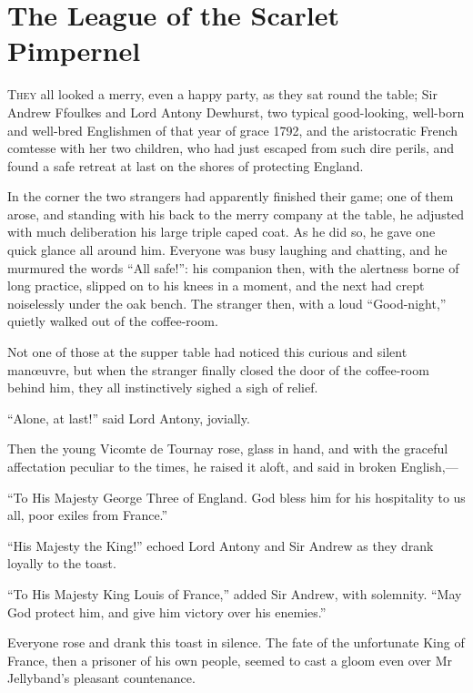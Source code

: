 
\chapter{The League of the Scarlet Pimpernel}

\lettrine[lines=4]{T}{hey} all looked a merry, even a happy party, as they sat round the table; Sir Andrew Ffoulkes and Lord Antony Dewhurst, two typical good-looking, well-born and well-bred Englishmen of that year of grace 1792, and the aristocratic French comtesse with her two children, who had just escaped from such dire perils, and found a safe retreat at last on the shores of protecting England.

In the corner the two strangers had apparently finished their game; one of them arose, and standing with his back to the merry company at the table, he adjusted with much deliberation his large triple caped coat. As he did so, he gave one quick glance all around him. Everyone was busy laughing and chatting, and he murmured the words \enquote{All safe!}: his companion then, with the alertness borne of long practice, slipped on to his knees in a moment, and the next had crept noiselessly under the oak bench. The stranger then, with a loud \enquote{Good-night,} quietly walked out of the coffee-room.

Not one of those at the supper table had noticed this curious and silent manœuvre, but when the stranger finally closed the door of the coffee-room behind him, they all instinctively sighed a sigh of relief.

\enquote{Alone, at last!} said Lord Antony, jovially.

Then the young Vicomte de Tournay rose, glass in hand, and with the graceful affectation peculiar to the times, he raised it aloft, and said in broken English,---

\enquote{To His Majesty George Three of England. God bless him for his hospitality to us all, poor exiles from France.}

\enquote{His Majesty the King!} echoed Lord Antony and Sir Andrew as they drank loyally to the toast.

\enquote{To His Majesty King Louis of France,} added Sir Andrew, with solemnity. \enquote{May God protect him, and give him victory over his enemies.}

Everyone rose and drank this toast in silence. The fate of the unfortunate King of France, then a prisoner of his own people, seemed to cast a gloom even over Mr Jellyband's pleasant countenance.

